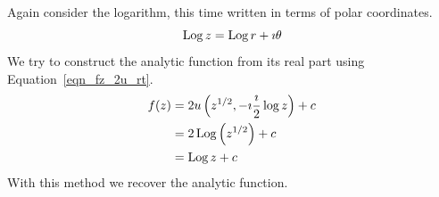 \begin{Example}
  Again consider the logarithm, this time written in terms of polar 
  coordinates.
  \[
  \mathop{\mathrm{Log}}\nolimits z = \mathop{\mathrm{Log}}\nolimits r + \imath \theta
  \]
  We try to construct the analytic function from its real part using
  Equation~\ref{eqn_fz_2u_rt}. 
  \begin{align*}
    f(z)
    &= 2 u \left( z^{1/2}, -\imath \frac{\imath}{2} \log z \right) + c 
    \\
    &= 2 \mathop{\mathrm{Log}}\nolimits \left( z^{1/2} \right) + c 
    \\
    &= \mathop{\mathrm{Log}}\nolimits z + c
  \end{align*}
  With this method we recover the analytic function.
\end{Example}







